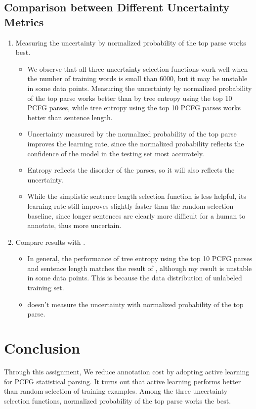 \documentclass[winfonts,UTF8]{article}
\begin{document}
\subsection{Comparison between Different Uncertainty Metrics}
\begin{enumerate}
\item Measuring the uncertainty by normalized probability of the top parse works best.
\begin{itemize}
\item We observe that all three uncertainty selection functions work well when the number of training words is small than 6000, but it may be unstable in some data points. Measuring the uncertainty by normalized probability of the top parse works better than by tree entropy using the top 10 PCFG parses, while tree entropy using the top 10 PCFG parses works better than sentence length.
\item Uncertainty measured by the normalized probability of the top parse improves the learning rate, since the normalized probability reflects the confidence of the model in the testing set most accurately.
\item Entropy reflects the disorder of the parses, so it will also reflects the uncertainty.
\item While the simplistic sentence length selection function is less helpful, its learning rate still improves slightly faster than the random selection baseline, since longer sentences are clearly more difficult for a human to annotate, thus more uncertain.
\end{itemize}
\item Compare results with \cite{hwa2000sample}.
\begin{itemize}
\item In general, the performance of tree entropy using the top 10 PCFG parses and sentence length matches the result of \cite{hwa2000sample}, although my result is unstable in some data points. This is because the data distribution of unlabeled training set.
\item \cite{hwa2000sample} doesn't measure the uncertainty with normalized probability of the top parse.
\end{itemize}
\end{enumerate}
\section{Conclusion}
Through this assignment, We reduce annotation cost by adopting active learning for PCFG statistical parsing. It turns out that active learning performs better than random selection of training examples. Among the three uncertainty selection functions, normalized probability of the top parse works the best.
\end{document}
